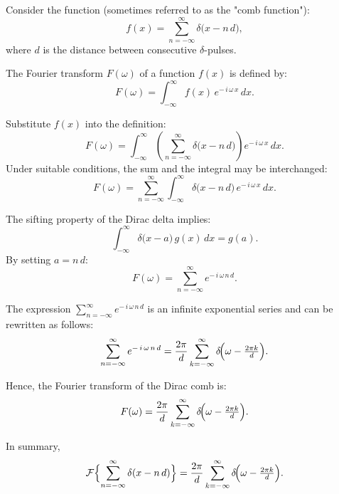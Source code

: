 Consider the function (sometimes referred to as the "comb function"):
\begin{equation}
f(x) = \sum_{n=-\infty}^{\infty} \delta\bigl(x - n\,d\bigr),
\end{equation}
where \(d\) is the distance between consecutive \(\delta\)-pulses.

The Fourier transform \(F(\omega)\) of a function \(f(x)\) is defined by:
\begin{equation}
F(\omega) 
= \int_{-\infty}^{\infty} f(x)\, e^{-\,i\,\omega\,x}\,dx.
\end{equation}

Substitute \(f(x)\) into the definition:
\begin{equation}
F(\omega)
= \int_{-\infty}^{\infty} 
\left(\sum_{n=-\infty}^{\infty} \delta\bigl(x - n\,d\bigr)\right) 
e^{-\,i\,\omega\,x} \, dx.
\end{equation}
Under suitable conditions, the sum and the integral may be interchanged:
\begin{equation}
F(\omega)
= \sum_{n=-\infty}^{\infty} 
\int_{-\infty}^{\infty} \delta\bigl(x - n\,d\bigr)\, e^{-\,i\,\omega\,x}\, dx.
\end{equation}

The sifting property of the Dirac delta implies:
\[
\int_{-\infty}^{\infty} \delta\bigl(x - a\bigr)\, g(x)\,dx 
= g(a).
\]
By setting \( a = n\,d \):
\begin{equation}
F(\omega)
= \sum_{n=-\infty}^{\infty} e^{-\,i\,\omega\,n\,d}.
\end{equation}

The expression
\(\sum_{n=-\infty}^{\infty} e^{-\,i\,\omega\,n\,d}\)
is an infinite exponential series and can be rewritten as follows:
\begin{equation}
\sum_{n=-\infty}^{\infty} e^{-\,i\,\omega\,n\,d}
= \frac{2\pi}{d} 
\sum_{k=-\infty}^{\infty} 
\delta\!\Bigl(\omega - \tfrac{2\pi k}{d}\Bigr).
\end{equation}

Hence, the Fourier transform of the Dirac comb is:
\begin{equation}
F(\omega)
= 
\frac{2\pi}{d}
\sum_{k=-\infty}^{\infty} 
\delta\!\Bigl(\omega - \tfrac{2\pi k}{d}\Bigr).
\end{equation}

In summary,
\[
\mathcal{F}\Bigl\{\sum_{n=-\infty}^{\infty} \delta(x - n\,d)\Bigr\}
= 
\frac{2\pi}{d} \sum_{k=-\infty}^{\infty} \delta\!\Bigl(\omega - \tfrac{2\pi k}{d}\Bigr).
\]
